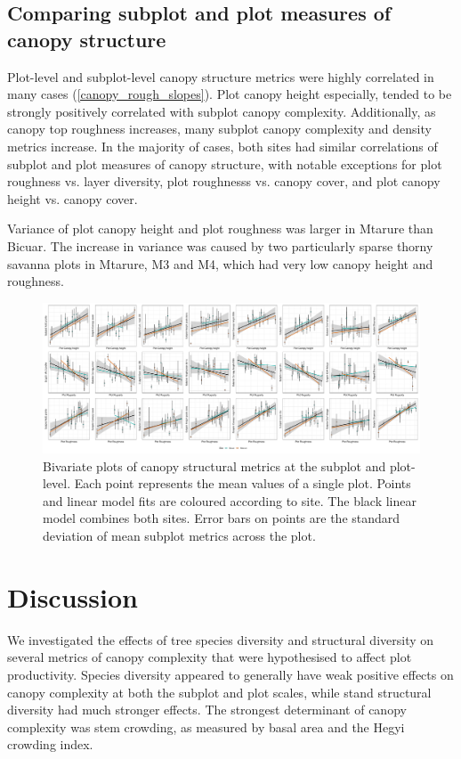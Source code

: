 \documentclass[11pt,a4paper]{article}
\begin{document}
\subsection{Comparing subplot and plot measures of canopy structure}

Plot-level and subplot-level canopy structure metrics were highly correlated in many cases (\autoref{canopy_rough_slopes}). Plot canopy height especially, tended to be strongly positively correlated with subplot canopy complexity. Additionally, as canopy top roughness increases, many subplot canopy complexity and density metrics increase. In the majority of cases, both sites had similar correlations of subplot and plot measures of canopy structure, with notable exceptions for plot roughness vs. layer diversity, plot roughnesss vs. canopy cover, and plot canopy height vs. canopy cover.

Variance of plot canopy height and plot roughness was larger in Mtarure than Bicuar. The increase in variance was caused by two particularly sparse thorny savanna plots in Mtarure, M3 and M4, which had very low canopy height and roughness.


\begin{figure}[H]
\centering
	\includegraphics[width=\textwidth]{plot_subplot_bivar}
	\caption{Bivariate plots of canopy structural metrics at the subplot and plot-level. Each point represents the mean values of a single plot. Points and linear model fits are coloured according to site. The black linear model combines both sites. Error bars on points are the standard deviation of mean subplot metrics across the plot.}
	\label{plot_subplot_bivar}
\end{figure}



\section{Discussion}

We investigated the effects of tree species diversity and structural diversity on several metrics of canopy complexity that were hypothesised to affect plot productivity. Species diversity appeared to generally have weak positive effects on canopy complexity at both the subplot and plot scales, while stand structural diversity had much stronger effects. The strongest determinant of canopy complexity was stem crowding, as measured by basal area and the Hegyi crowding index.
\end{document}
